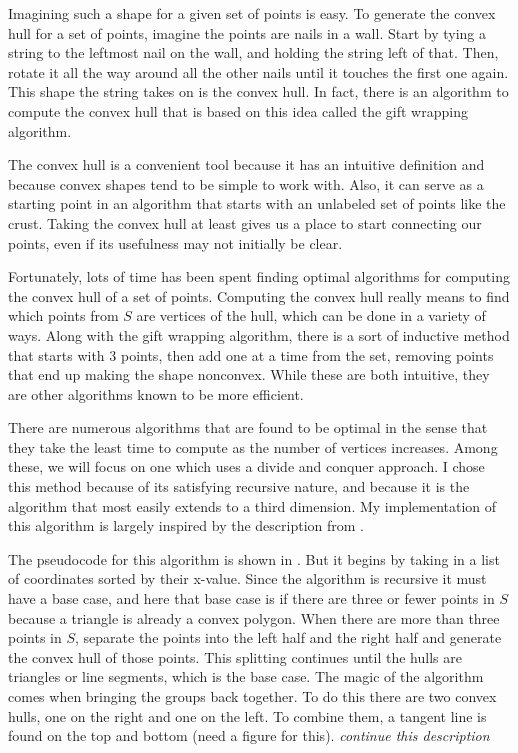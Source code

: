 Imagining such a shape for a given set of points is easy.
To generate the convex hull for a set of points, imagine the points are nails in a wall.
Start by tying a string to the leftmost nail on the wall, and holding the string left of that.
Then, rotate it all the way around all the other nails until it touches the first one again.
This shape the string takes on is the convex hull.
In fact, there is an algorithm to compute the convex hull that is based on this idea called the gift wrapping algorithm.



The convex hull is a convenient tool because it has an intuitive definition and because convex shapes tend to be simple to work with.
Also, it can serve as a starting point in an algorithm that starts with an unlabeled set of points like the crust.
Taking the convex hull at least gives us a place to start connecting our points, even if its usefulness may not initially be clear.

Fortunately, lots of time has been spent finding optimal algorithms for computing the convex hull of a set of points.
Computing the convex hull really means to find which points from $S$ are vertices of the hull, which can be done in a variety of ways.
Along with the gift wrapping algorithm, there is a sort of inductive method that starts with 3 points, then add one at a time from the set, removing points that end up making the shape nonconvex.
While these are both intuitive, they are other algorithms known to be more efficient.

There are numerous algorithms that are found to be optimal in the sense that they take the least time to compute as the number of vertices increases.
Among these, we will focus on one which uses a divide and conquer approach.
I chose this method because of its satisfying recursive nature, and because it is the algorithm that most easily extends to a third dimension.
My implementation of this algorithm is largely inspired by the description from \citet{textbook}.

The pseudocode for this algorithm is shown in . But it begins by taking in a list of coordinates sorted by their x-value.
Since the algorithm is recursive it must have a base case, and here that base case is if there are three or fewer points in $S$ because a triangle is already a convex polygon.
When there are more than three points in $S$, separate the points into the left half and the right half and generate the convex hull of those points.
This splitting continues until the hulls are triangles or line segments, which is the base case.
The magic of the algorithm comes when bringing the groups back together.
To do this there are two convex hulls, one on the right and one on the left.
To combine them, a tangent line is found on the top and bottom (need a figure for this).
\textit{continue this description}

